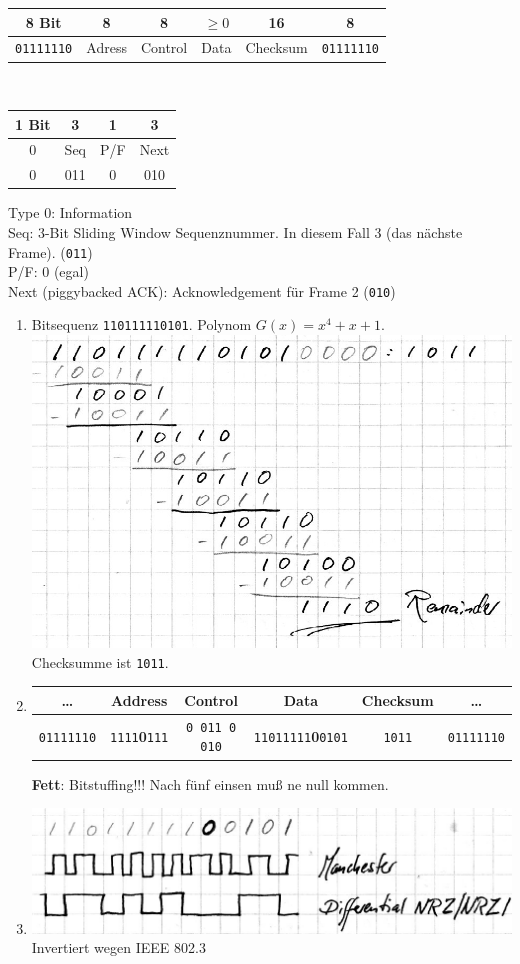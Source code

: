 \documentclass[10pt,a4paper]{scrartcl}
\begin{document}
\begin{tabular}{|c|c|c|c|c|c|}
\hline 8 Bit & 8 & 8 & $\geq0$ & 16 & 8 \\ 
\hline \texttt{01111110} & Adress & Control & Data & Checksum & \texttt{01111110} \\ 
\hline 
\end{tabular} \\
\begin{tabular}{|c|c|c|c|}
\hline 1 Bit & 3 & 1 & 3 \\ 
\hline 0 & Seq & P/F & Next \\ 
\hline 0 & 011 & 0 & 010 \\
\hline 
\end{tabular} 
Type 0: Information\\
Seq: 3-Bit Sliding Window Sequenznummer. In diesem Fall 3 (das nächste Frame). (\texttt{011})\\
P/F: 0 (egal)\\
Next (piggybacked ACK): Acknowledgement für Frame 2 (\texttt{010})\\
\begin{enumerate}
\item Bitsequenz \texttt{110111110101}. Polynom $G(x)=x^4+x+1$.\\
\includegraphics{a4e2_1.jpg}\\
Checksumme ist \texttt{1011}.
\item 
\begin{tabular}{|c|c|c|c|c|c|}
\hline \ldots & Address & Control & Data & Checksum & \ldots \\ 
\hline \texttt{01111110} & \texttt{1111}\textbf{0}\texttt{111} & \texttt{0 011 0 010} & \texttt{11011111}\textbf{0}\texttt{0101} & \texttt{1011} & \texttt{01111110} \\ 
\hline 
\end{tabular} \textbf{Fett}: Bitstuffing!!! Nach fünf einsen muß ne null kommen.
\item 
\includegraphics{a4e2_3.jpg} Invertiert wegen IEEE 802.3
\end{enumerate}
\end{document}
